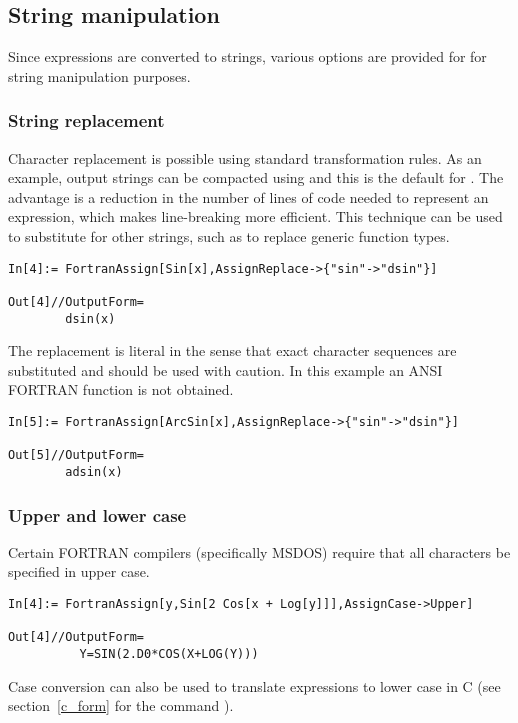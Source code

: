 \documentclass [12pt,twoside]{article}
\begin{document}
\pagebreak[2]

\subsection{String manipulation}\label{str_manip}
Since expressions are converted to strings, various options are provided for for
string manipulation purposes.

\subsubsection{String replacement}
Character replacement is possible using standard transformation rules.
As an example, output strings can be compacted using
 and this is the default for
. The advantage is a reduction in the number of
lines of code needed to represent an expression, which makes line-breaking more
efficient. This technique can be used to substitute for other strings, such as to
replace generic function types.

\begin{verbatim}
In[4]:= FortranAssign[Sin[x],AssignReplace->{"sin"->"dsin"}]

Out[4]//OutputForm=
        dsin(x)
\end{verbatim}
The replacement is literal in the sense that exact character sequences are substituted
and should be used with caution. In this example an ANSI FORTRAN function is not
obtained.

\begin{verbatim}
In[5]:= FortranAssign[ArcSin[x],AssignReplace->{"sin"->"dsin"}]

Out[5]//OutputForm=
        adsin(x)
\end{verbatim}

\subsubsection{Upper and lower case}

Certain FORTRAN compilers (specifically MSDOS) require that all characters be
specified in upper case.
\begin{verbatim}
In[4]:= FortranAssign[y,Sin[2 Cos[x + Log[y]]],AssignCase->Upper]

Out[4]//OutputForm=
          Y=SIN(2.D0*COS(X+LOG(Y)))
\end{verbatim}
Case conversion can also be used to translate expressions to lower case in C
(see section~\ref{c_form} for the command ).
\end{document}
